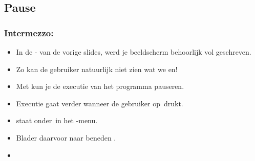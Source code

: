 \begin{frame}
\end{frame}



\subsection{Pause}

\begin{frame}
\frametitle{Intermezzo: }

\begin{itemize}
  \item<1-> In de - van de vorige slides, werd je beeldscherm behoorlijk vol geschreven.
  \item<2-> Zo kan de gebruiker natuurlijk niet zien wat we en!
  \item<3-> Met  kun je de executie van het programma pauseren.
  \item<4-> Executie gaat verder wanneer de gebruiker op \tiENTER\,drukt.
  \item<5->  staat onder \tiPRGM\,in het -menu.
  \item<6-> Blader daarvoor naar beneden \tiDown.
  \item<7-> 
\end{itemize}

\vspace{2cm}


\end{frame}
